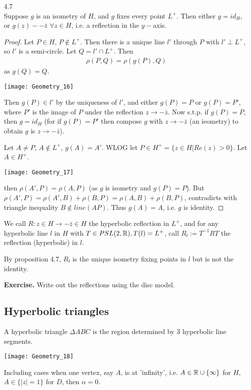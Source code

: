 \documentclass[a4paper]{article}
\begin{document}
\begin{lemma} 4.7\\
Suppose $g$ is an isometry of $H$, and $g$ fixes every point $L^+$. Then either $g=id_H$, or $g(z) - -\bar{z}$ $\forall z \in H$, i.e. a reflection in the $y-$axis.
\begin{proof}
Let $P \in H$, $P \not\in L^+$. Then there is a unique line $l'$ through $P$ with $l' \perp L^+$, so $l'$ is a semi-circle. Let $Q=l' \cap L^+$. Then
\begin{equation*}
\begin{aligned}
\rho(P,Q) = \rho(g(P),Q)
\end{aligned}
\end{equation*}
as $g(Q)=Q$.

\texttt{[image: Geometry\_16]}

Then $g(P) \in l'$ by the uniqueness of $l'$, and either $g(P) = P$ or $g(P) = P'$, where $P'$ is the image of $P$ under the reflection $z \to -\bar{z}$. Now s.t.p. if $g(P) = P$, then $g=id_H$ (for if $g(P) = P'$ then compose $g$ with $z \to -\bar{z}$ (an ieometry) to obtain $g$ is $z \to -\bar{z}$).

Let $A \neq P$, $A \not\in L^+$, $g(A) = A'$. WLOG let $P \in H^+ = \{z \in H | Re(z)>0\}$. Let $A \in H^+$.

\texttt{[image: Geometry\_17]}

then $\rho(A',P) = \rho(A,P)$ (as $g$ is isometry and $g(P)=P$). But $\rho(A',P) = \rho(A',B)+\rho(B,P) = \rho(A,B) + \rho(B,P)$, contradicts with triangle inequality $B \not\in line(AP)$. Thus $g(A)=A$, i.e. $g$ is identity.
\end{proof}
\end{lemma}

We call $R: z \in H \to -\bar{z} \in H$ the hyperbolic reflection in $L^+$, and for any hyperbolic line $l$ in $H$ with $T \in PSL(2,\mathbb{R}), T(l)=L^+$, call $R_l := T^{-1}RT$ the reflection (hyperbolic) in $l$.

By proposition 4.7, $R_l$ is the unique isometry fixing points in $l$ but is not the identity.

\textbf{Exercise.} Write out the reflections using the disc model.

\subsection{Hyperbolic triangles}
\begin{defi}
A hyperbolic triangle $\Delta ABC$ is the region determined by 3 hyperbolic line segments.

\texttt{[image: Geometry\_18]}

Including cases when one vertex, say $A$, is at 'infinity', i.e. $A \in \mathbb{R} \cup \{\infty\}$ for $H$, $A \in \{|z|=1\}$ for $D$, then $\alpha = 0$.
\end{defi}
\end{document}
